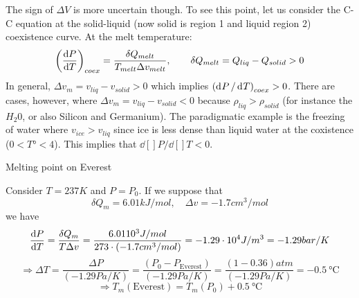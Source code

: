\documentclass[../../Main/Main.tex]{subfiles}
\begin{document}
The sign of \( \Delta V \) is more uncertain though. To see this point, let us consider the C-C equation at the solid-liquid (now solid is region 1 and liquid region 2) coexistence curve.
At the melt temperature:
\begin{equation*}
  \qty(\dv{P}{T} )_{coex} = \frac{\delta Q_{melt}}{T_{melt}\Delta v_{melt}}, \qquad \delta Q_{melt} = Q_{liq} - Q_{solid} > 0
  \label{eq:}
\end{equation*}
In general, \( \Delta v_m = v_{liq} - v_{solid} > 0 \) which implies \( \qty( \dd[]{P}/\dd[]{T}   )_{coex} > 0  \). There are cases, however, where \( \Delta v_m = v_{liq} - v_{solid} < 0 \) because \( \rho_{liq} > \rho _{solid} \) (for instance the \( H_2 0 \), or also Silicon and Germanium). The paradigmatic example is the freezing of water where \( v_{ice} > v_{liq} \) since ice is less dense than liquid water at the coxistence (\( 0 < T° < 4 \)). This implies that \( \dd[]{P}/\dd[]{T} < 0   \).

\begin{example}{Melting point on Everest}{}

Consider \( T = 237 K \) and \( P=P_0 \). If we suppose that
\begin{equation*}
\delta Q_m = 6.01 kJ/mol, \quad \Delta v = -1.7 cm^3 /mol    
\end{equation*}
we have
\begin{equation*}
  \dv{P}{T}  = \frac{\delta Q_m}{T \Delta v} = \frac{6.01 10^3 J/mol}{273 \cdot (-1.7 cm^3/mol)} = -1.29 \cdot 10^4 J/m^3 = -1.29 bar/K
  \label{eq:}
\end{equation*}
\begin{equation*}
  \Rightarrow \Delta T = \frac{\Delta P}{(-1.29 Pa/K)} = \frac{(P_0 - P_{\text{Everest}})}{(-1.29 Pa/K)} = \frac{(1-0.36)atm}{(-1.29 Pa/K)} = -0.5\SI{}{\celsius}
  \label{eq:}
\end{equation*}
\begin{equation*}
  \Rightarrow T_m ( \text{Everest}) = T_m (P_0) + 0.5\SI{}{\celsius}
  \label{eq:}
\end{equation*}
\end{example}
\end{document}
